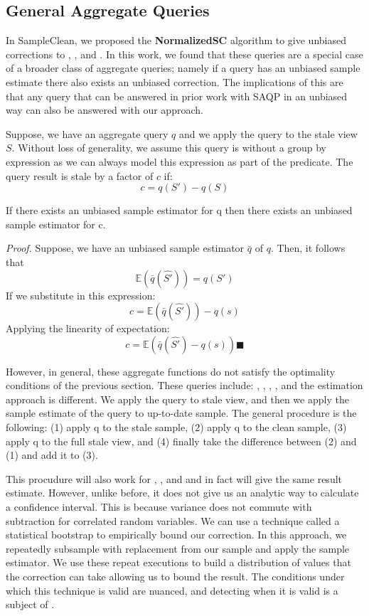 \subsection{General Aggregate Queries}
In SampleClean, we proposed the \textbf{NormalizedSC} algorithm to give unbiased corrections to \sumfunc, \countfunc, and \avgfunc.
In this work, we found that these queries are a special case of a broader class of aggregate queries; namely if a query has an unbiased sample estimate there also exists an unbiased correction.
The implications of this are that any query that can be answered in prior work with SAQP in an unbiased way can also be answered with our approach.

Suppose, we have an aggregate query $q$ and we apply the query to the stale view $S$.
Without loss of generality, we assume this query is without a group by expression as we can always model this expression as part of the predicate.
The query result is stale by a factor of $c$ if:
\[ c = q(S') - q(S)\] 

\begin{lemma}
If there exists an unbiased sample estimator for q then there exists an unbiased sample estimator for c.
\end{lemma}

\emph{Proof.} Suppose, we have an unbiased sample estimator $\bar{q}$ of $q$. 
Then, it follows that \[\mathbb{E}(\bar{q}(\hat{S'})) = q(S')\]
If we substitute in this expression:
\[ c = \mathbb{E}(\bar{q}(\hat{S'})) -q(s) \] 
Applying the linearity of expectation:
\[ c = \mathbb{E}(\bar{q}(\hat{S'}) - q(s)) \blacksquare \]

However, in general, these aggregate functions do not satisfy the optimality conditions of the previous section.
These queries include: \histfunc, \corrfunc, \varfunc, \covfunc, and the estimation approach is different.
We apply the query to stale view, and then we apply the sample estimate of the query to up-to-date sample.
The general procedure is the following: (1) apply q to the stale sample, (2) apply q to the clean sample, (3) apply q to the full stale view, and (4) finally take the difference between (2) and (1) and add it to (3). 

This procudure will also work for \sumfunc, \countfunc, and \avgfunc and in fact will give the same result estimate.
However, unlike before, it does not give us an analytic way to calculate a confidence interval.
This is because variance does not commute with subtraction for correlated random variables.
We can use a technique called a statistical bootstrap \cite{AgarwalMPMMS13} to empirically bound our correction.
In this approach, we repeatedly subsample with replacement from our sample and apply the sample estimator.
We use these repeat executions to build a distribution of values that the correction can take allowing us to bound the result.
The conditions under which this technique is valid are nuanced, and detecting when it is valid is a subject of \cite{agarwalknowing}.

